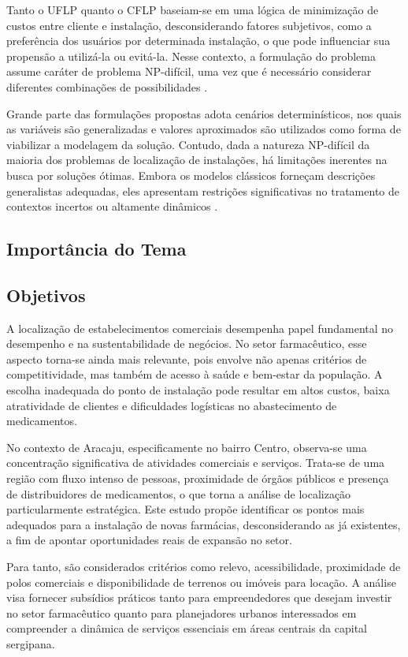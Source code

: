 \documentclass[12pt]{article}
\begin{document}
Tanto o UFLP quanto o CFLP baseiam-se em uma lógica de minimização de custos entre cliente e instalação, desconsiderando fatores subjetivos, como a preferência dos usuários por determinada instalação, o que pode influenciar sua propensão a utilizá-la ou evitá-la. Nesse contexto, a formulação do problema assume caráter de problema NP-difícil, uma vez que é necessário considerar diferentes combinações de possibilidades \cite{Kang2023}.

Grande parte das formulações propostas adota cenários determinísticos, nos quais as variáveis são generalizadas e valores aproximados são utilizados como forma de viabilizar a modelagem da solução. Contudo, dada a natureza NP-difícil da maioria dos problemas de localização de instalações, há limitações inerentes na busca por soluções ótimas. Embora os modelos clássicos forneçam descrições generalistas adequadas, eles apresentam restrições significativas no tratamento de contextos incertos ou altamente dinâmicos \cite{OwenDaskin1998}.

\subsection{Importância do Tema}

\subsection{Objetivos}

A localização de estabelecimentos comerciais desempenha papel fundamental no desempenho e na sustentabilidade de negócios. No setor farmacêutico, esse aspecto torna-se ainda mais relevante, pois envolve não apenas critérios de competitividade, mas também de acesso à saúde e bem-estar da população. A escolha inadequada do ponto de instalação pode resultar em altos custos, baixa atratividade de clientes e dificuldades logísticas no abastecimento de medicamentos.

No contexto de Aracaju, especificamente no bairro Centro, observa-se uma concentração significativa de atividades comerciais e serviços. Trata-se de uma região com fluxo intenso de pessoas, proximidade de órgãos públicos e presença de distribuidores de medicamentos, o que torna a análise de localização particularmente estratégica. Este estudo propõe identificar os pontos mais adequados para a instalação de novas farmácias, desconsiderando as já existentes, a fim de apontar oportunidades reais de expansão no setor.

Para tanto, são considerados critérios como relevo, acessibilidade, proximidade de polos comerciais e disponibilidade de terrenos ou imóveis para locação. A análise visa fornecer subsídios práticos tanto para empreendedores que desejam investir no setor farmacêutico quanto para planejadores urbanos interessados em compreender a dinâmica de serviços essenciais em áreas centrais da capital sergipana.
\end{document}
